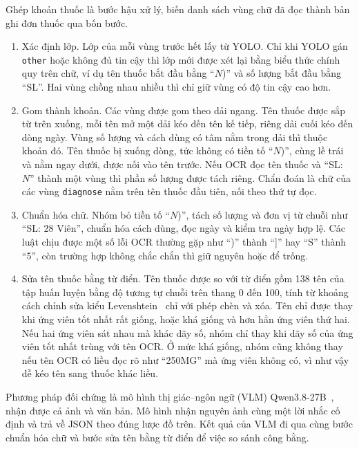 Ghép khoản thuốc là bước hậu xử lý, biến danh sách vùng chữ đã đọc thành bản ghi đơn thuốc qua bốn bước.
\begin{enumerate}[label=\arabic*.]
  \item Xác định lớp. Lớp của mỗi vùng trước hết lấy từ YOLO. Chỉ khi YOLO gán \texttt{other} hoặc không đủ tin cậy thì lớp mới được xét lại bằng biểu thức chính quy trên chữ, ví dụ tên thuốc bắt đầu bằng ``$N$)'' và số lượng bắt đầu bằng ``SL''. Hai vùng chồng nhau nhiều thì chỉ giữ vùng có độ tin cậy cao hơn.
  \item Gom thành khoản. Các vùng được gom theo dải ngang. Tên thuốc được sắp từ trên xuống, mỗi tên mở một dải kéo đến tên kế tiếp, riêng dải cuối kéo đến dòng ngày. Vùng số lượng và cách dùng có tâm nằm trong dải thì thuộc khoản đó. Tên thuốc bị xuống dòng, tức không có tiền tố ``$N$)'', cùng lề trái và nằm ngay dưới, được nối vào tên trước. Nếu OCR đọc tên thuốc và ``SL: $N$'' thành một vùng thì phần số lượng được tách riêng. Chẩn đoán là chữ của các vùng \texttt{diagnose} nằm trên tên thuốc đầu tiên, nối theo thứ tự đọc.
  \item Chuẩn hóa chữ. Nhóm bỏ tiền tố ``$N$)'', tách số lượng và đơn vị từ chuỗi như ``SL: 28 Viên'', chuẩn hóa cách dùng, đọc ngày và kiểm tra ngày hợp lệ. Các luật chịu được một số lỗi OCR thường gặp như ``)'' thành ``]'' hay ``S'' thành ``5'', còn trường hợp không chắc chắn thì giữ nguyên hoặc để trống.
  \item Sửa tên thuốc bằng từ điển. Tên thuốc được so với từ điển gồm 138 tên của tập huấn luyện bằng độ tương tự chuỗi trên thang 0 đến 100, tính từ khoảng cách chỉnh sửa kiểu Levenshtein~\cite{levenshtein1966} chỉ với phép chèn và xóa. Tên chỉ được thay khi ứng viên tốt nhất rất giống, hoặc khá giống và hơn hẳn ứng viên thứ hai. Nếu hai ứng viên sát nhau mà khác dãy số, nhóm chỉ thay khi dãy số của ứng viên tốt nhất trùng với tên OCR. Ở mức khá giống, nhóm cũng không thay nếu tên OCR có liều đọc rõ như ``250MG'' mà ứng viên không có, vì như vậy dễ kéo tên sang thuốc khác liều.
\end{enumerate}
Phương pháp đối chứng là mô hình thị giác--ngôn ngữ (VLM) Qwen3.8-27B~\cite{qwen38}, nhận được cả ảnh và văn bản.
Mô hình nhận nguyên ảnh cùng một lời nhắc cố định và trả về JSON theo đúng lược đồ trên.
Kết quả của VLM đi qua cùng bước chuẩn hóa chữ và bước sửa tên bằng từ điển để việc so sánh công bằng.
